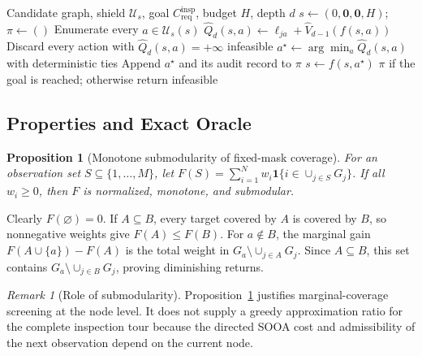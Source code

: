 \documentclass{IEEEtaes}
\newtheorem{proposition}{Proposition}
\theoremstyle{remark}
\newtheorem{remark}{Remark}
\theoremstyle{plain}
\begin{document}
\begin{algorithm}[t]
\caption{Viability-preserving rollout ADP}
\label{alg:safe-graph-api}
\begin{algorithmic}[1]
\Require Candidate graph, shield $\mathcal U_s$, goal $C_{\mathrm{req}}^{\mathrm{insp}}$, budget $H$, depth $d$
\State $s\gets(0,\mathbf0,\mathbf0,H)$; $\pi\gets()$
  \State Enumerate every $a\in\mathcal U_s(s)$
    \State $\widehat Q_d(s,a)\gets\ell_{ja}+\widehat V_{d-1}(f(s,a))$
  \EndFor
  \State Discard every action with $\widehat Q_d(s,a)=+\infty$
   \State \Return infeasible \EndIf
  \State $a^\star\gets\arg\min_a \widehat Q_d(s,a)$ with deterministic ties
  \State Append $a^\star$ and its audit record to $\pi$
  \State $s\gets f(s,a^\star)$
\EndWhile
\State \Return $\pi$ if the goal is reached; otherwise return infeasible
\end{algorithmic}
\end{algorithm}

\subsection{Properties and Exact Oracle}
\label{sec:theory}

\begin{proposition}[Monotone submodularity of fixed-mask coverage]
\label{prop:submodular-coverage}
For an observation set $S\subseteq\{1,\ldots,M\}$, let $F(S)=\sum_{i=1}^{N}w_i\mathbf1\{i\in\cup_{j\in S}G_j\}$. If all $w_i\ge0$, then $F$ is normalized, monotone, and submodular.
\end{proposition}

\begin{IEEEproof}
Clearly $F(\varnothing)=0$. If $A\subseteq B$, every target covered by $A$ is covered by $B$, so nonnegative weights give $F(A)\le F(B)$. For $a\notin B$, the marginal gain $F(A\cup\{a\})-F(A)$ is the total weight in $G_a\setminus\cup_{j\in A}G_j$. Since $A\subseteq B$, this set contains $G_a\setminus\cup_{j\in B}G_j$, proving diminishing returns.
\end{IEEEproof}

\begin{remark}[Role of submodularity]
Proposition~\ref{prop:submodular-coverage} justifies marginal-coverage screening at the node level. It does not supply a greedy approximation ratio for the complete inspection tour because the directed SOOA cost and admissibility of the next observation depend on the current node.
\end{remark}
\end{document}
